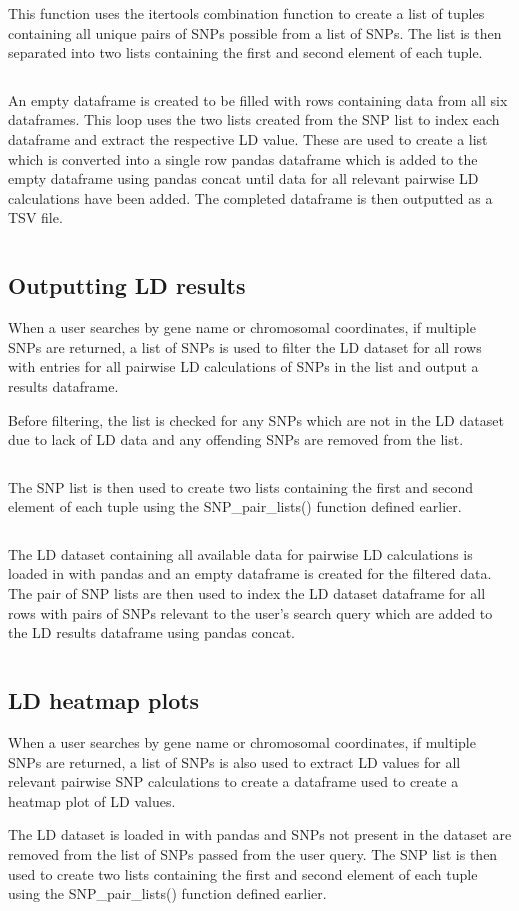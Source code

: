 \documentclass[12pt,a4paper]{article}
\newcommand{\subsect}[1]{
\hypertarget{#1}{
\subsection{#1}\label{#1}}
}
\begin{document}
This function uses the itertools combination function to create a list of tuples containing all unique pairs of SNPs possible from a list of SNPs. The list is then separated into two lists containing the first and second element of each tuple.
\inputminted{python}{code_snippets/placeholder.py}

An empty dataframe is created to be filled with rows containing data from all six dataframes. This loop uses the two lists created from the SNP list to index each dataframe and extract the respective LD value. These are used to create a list which is converted into a single row pandas dataframe which is added to the empty dataframe using pandas concat until data for all relevant pairwise LD calculations have been added. The completed dataframe is then outputted as a TSV file.
\inputminted{python}{code_snippets/placeholder.py}


\subsect{Outputting LD results}
When a user searches by gene name or chromosomal coordinates, if multiple SNPs are returned, a list of SNPs is used to filter the LD dataset for all rows with entries for all pairwise LD calculations of SNPs in the list and output a results dataframe.


Before filtering, the list is checked for any SNPs which are not in the LD dataset due to lack of LD data and any offending SNPs are removed from the list.
\inputminted{python}{code_snippets/placeholder.py}

The SNP list is then used to create two lists containing the first and second element of each tuple using the SNP\_pair\_lists() function defined earlier.
\inputminted{python}{code_snippets/placeholder.py}


The LD dataset containing all available data for pairwise LD calculations is loaded in with pandas and an empty dataframe is created for the filtered data. The pair of SNP lists are then used to index the LD dataset dataframe for all rows with pairs of SNPs relevant to the user’s search query which are added to the LD results dataframe using pandas concat.
\inputminted{python}{code_snippets/placeholder.py}

\subsect{LD heatmap plots}

When a user searches by gene name or chromosomal coordinates, if multiple SNPs are returned, a list of SNPs is also used to extract LD values for all relevant pairwise SNP calculations to create a dataframe used to create a heatmap plot of LD values.

The LD dataset is loaded in with pandas and SNPs not present in the dataset are removed from the list of SNPs passed from the user query. The SNP list is then used to create two lists containing the first and second element of each tuple using the SNP\_pair\_lists() function defined earlier.
\inputminted{python}{code_snippets/placeholder.py}
\end{document}

